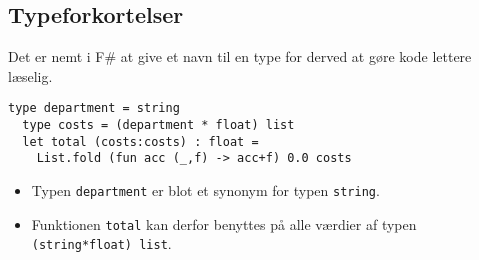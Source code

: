 \documentclass[rgb]{beamer}
\begin{document}
\subsection{Typeforkortelser}
\begin{frame}[fragile]
\begin{footnotesize}

  \vspace{1ex}

  Det er nemt i F\# at give et navn til en type for derved at gøre kode lettere læselig.
\begin{lstlisting}[numbers=none,frame=none,mathescape]
  type department = string
  type costs = (department * float) list
  let total (costs:costs) : float =
    List.fold (fun acc (_,f) -> acc+f) 0.0 costs
\end{lstlisting}

  \vspace{1ex}

  \begin{itemize}
  \item Typen \lstinline{department} er blot et synonym for typen \lstinline{string}.
  \item Funktionen \lstinline{total} kan derfor benyttes på alle
    værdier af typen \lstinline{(string*float) list}.
  \end{itemize}

\end{footnotesize}
\end{frame}
\end{document}
